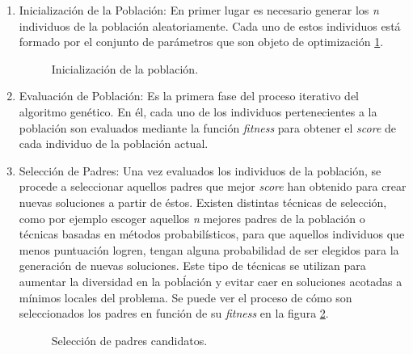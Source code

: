             \begin{enumerate}
                \item Inicialización de la Población:
                        En primer lugar es necesario generar los \textit{n} individuos de la población aleatoriamente. Cada uno de estos individuos está formado por el conjunto de parámetros que son objeto de optimización \ref{InitialPopulation}.

                        \begin{figure}[h]
                            \centering
                            
                            \caption{Inicialización de la población.}
                            \label{InitialPopulation}
                        \end{figure}

                \item Evaluación de Población:
                        Es la primera fase del proceso iterativo del algoritmo genético. En él, cada uno de los individuos pertenecientes a la población son evaluados mediante la función \textit{fitness} para obtener el \textit{score} de cada individuo de la población actual.

                \item Selección de Padres:
                        Una vez evaluados los individuos de la población, se procede a seleccionar aquellos padres que mejor \textit{score} han obtenido para crear nuevas soluciones a partir de éstos. Existen distintas técnicas de selección, como por ejemplo escoger aquellos \textit{n} mejores padres de la población o técnicas basadas en métodos probabilísticos, para que aquellos individuos que menos puntuación logren, tengan alguna probabilidad de ser elegidos para la generación de nuevas soluciones. Este tipo de técnicas se utilizan para aumentar la diversidad en la pobĺación y evitar caer en soluciones acotadas a mínimos locales del problema. Se puede ver el proceso de cómo son seleccionados los padres en función de su \textit{fitness} en la figura \ref{FitnessFunction}.

                        \begin{figure}[h]
                            \centering
                            
                            \caption{Selección de padres candidatos.}
                            \label{FitnessFunction}
                        \end{figure}


\end{enumerate}
